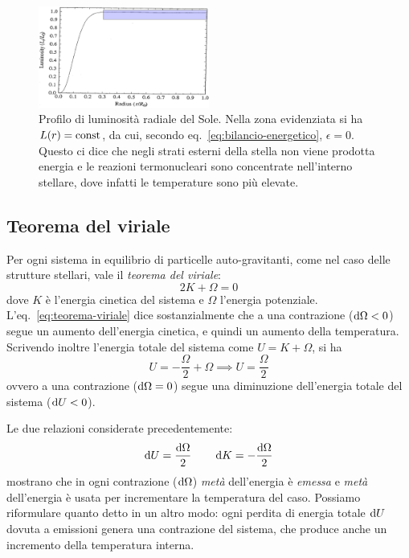 \begin{figure}
\centering
\includegraphics[width=0.5\textwidth]{immagini/profilo-luminosita-radiale-sole.png}
\caption{Profilo di luminosità radiale del Sole. Nella zona evidenziata si ha $L(r) = \textup{const}$, da cui, secondo eq.~\eqref{eq:bilancio-energetico}, $\epsilon = 0$. Questo ci dice che negli strati esterni della stella non viene prodotta energia e le reazioni termonucleari sono concentrate nell'interno stellare, dove infatti le temperature sono più elevate.}
\label{fig:profilo-luminosità-sole}
\end{figure}

\subsection{Teorema del viriale}
Per ogni sistema in equilibrio di particelle auto-gravitanti, come nel caso delle strutture stellari, vale il \emph{teorema del viriale}:
\begin{equation}\label{eq:teorema-viriale}
    2K + \Omega = 0
\end{equation}
dove $K$ è l'energia cinetica del sistema e $\Omega$ l'energia potenziale. L'eq.~\eqref{eq:teorema-viriale} dice sostanzialmente che a una contrazione ($\mathop{}\!\mathrm{d} \Omega < 0$) segue un aumento dell'energia cinetica, e quindi un aumento della temperatura. Scrivendo inoltre l'energia totale del sistema come $U = K + \Omega$, si ha
\[
U = - \frac{\Omega}{2} + \Omega \implies U = \frac{\Omega}{2}
\]
ovvero a una contrazione ($\mathop{}\!\mathrm{d} \Omega = 0$) segue una diminuzione dell'energia totale del sistema ($\mathop{}\!\mathrm{d} U < 0$).

Le due relazioni considerate precedentemente:
\begin{equation}\label{eq:viriale-differenziale}
\mathop{}\!\mathrm{d} U = \frac{\mathop{}\!\mathrm{d} \Omega}{2} \qquad \mathop{}\!\mathrm{d} K = - \frac{\mathop{}\!\mathrm{d} \Omega}{2}
\end{equation}
mostrano che in ogni contrazione ($\mathop{}\!\mathrm{d} \Omega$) \emph{metà} dell'energia è \emph{emessa} e \emph{metà} dell'energia è usata per incrementare la temperatura del caso. Possiamo riformulare quanto detto in un altro modo: ogni perdita di energia totale $\mathop{}\!\mathrm{d} U$ dovuta a emissioni genera una contrazione del sistema, che produce anche un incremento della temperatura interna.

